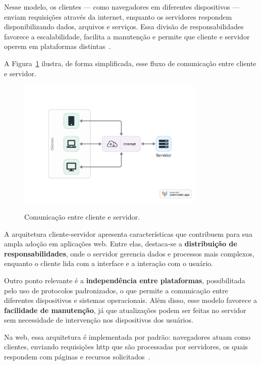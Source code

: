 Nesse modelo, os clientes — como navegadores em diferentes dispositivos — enviam requisições através da internet, enquanto os servidores respondem disponibilizando dados, arquivos e serviços. Essa divisão de responsabilidades favorece a escalabilidade, facilita a manutenção e permite que cliente e servidor operem em plataformas distintas~\cite{fundamentosDevWeb}.

A Figura~\ref{fig:cliente-servidor} ilustra, de forma simplificada, esse fluxo de comunicação entre cliente e servidor.

\begin{figure}[H]
  \centering
  \caption{Comunicação entre cliente e servidor.}
  \includegraphics[width=0.8\textwidth]{media/cliente_servidor.jpeg}
  \label{fig:cliente-servidor}
\end{figure}


A arquitetura cliente-servidor apresenta características que contribuem para sua ampla adoção em aplicações web. Entre elas, destaca-se a \textbf{distribuição de responsabilidades}, onde o servidor gerencia dados e processos mais complexos, enquanto o cliente lida com a interface e a interação com o usuário. 

Outro ponto relevante é a \textbf{independência entre plataformas}, possibilitada pelo uso de protocolos padronizados, o que permite a comunicação entre diferentes dispositivos e sistemas operacionais. Além disso, esse modelo favorece a \textbf{facilidade de manutenção}, já que atualizações podem ser feitas no servidor sem necessidade de intervenção nos dispositivos dos usuários.

Na web, essa arquitetura é implementada por padrão: navegadores atuam como clientes, enviando requisições \acrshort{http} que são processadas por servidores, os quais respondem com páginas e recursos solicitados~\cite{fundamentosDevWeb}.


